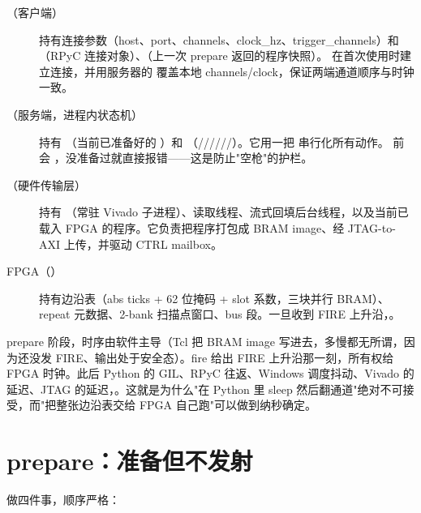 \documentclass[11pt,oneside,openany]{book}
\begin{document}
\begin{description}
\item[（客户端）] 持有连接参数（host、port、channels、clock\_hz、trigger\_channels）和 （RPyC 连接对象）、（上一次 prepare 返回的程序快照）。 在首次使用时建立连接，并用服务器的  覆盖本地 channels/clock，保证两端通道顺序与时钟一致。
\item[（服务端，进程内状态机）] 持有 （当前已准备好的 ）和 （//////）。它用一把  串行化所有动作。 前会 ，没准备过就直接报错——这是防止"空枪"的护栏。
\item[（硬件传输层）] 持有 （常驻 Vivado 子进程）、读取线程、流式回填后台线程，以及当前已载入 FPGA 的程序。它负责把程序打包成 BRAM image、经 JTAG-to-AXI 上传，并驱动 CTRL mailbox。
\item[FPGA（）] 持有边沿表（abs ticks + 62 位掩码 + slot 系数，三块并行 BRAM）、repeat 元数据、2-bank 扫描点窗口、bus 段。一旦收到 FIRE 上升沿，。
\end{description}

\begin{notebox}
prepare 阶段，时序由软件主导（Tcl 把 BRAM image 写进去，多慢都无所谓，因为还没发 FIRE、输出处于安全态）。fire 给出 FIRE 上升沿那一刻，所有权给 FPGA 时钟。此后 Python 的 GIL、RPyC 往返、Windows 调度抖动、Vivado 的延迟、JTAG 的延迟，。这就是为什么"在 Python 里 sleep 然后翻通道"绝对不可接受，而"把整张边沿表交给 FPGA 自己跑"可以做到纳秒确定。
\end{notebox}

\section{prepare：准备但不发射}

 做四件事，顺序严格：
\end{document}
